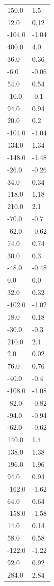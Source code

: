 \begin{longtable}{ll}
150.0 & 1.5 \\
12.0 & 0.12 \\
-104.0 & -1.04 \\
400.0 & 4.0 \\
36.0 & 0.36 \\
-6.0 & -0.06 \\
54.0 & 0.54 \\
-10.0 & -0.1 \\
94.0 & 0.94 \\
20.0 & 0.2 \\
-104.0 & -1.04 \\
134.0 & 1.34 \\
-148.0 & -1.48 \\
-26.0 & -0.26 \\
34.0 & 0.34 \\
118.0 & 1.18 \\
210.0 & 2.1 \\
-70.0 & -0.7 \\
-62.0 & -0.62 \\
74.0 & 0.74 \\
30.0 & 0.3 \\
-48.0 & -0.48 \\
0.0 & 0.0 \\
32.0 & 0.32 \\
-102.0 & -1.02 \\
18.0 & 0.18 \\
-30.0 & -0.3 \\
210.0 & 2.1 \\
2.0 & 0.02 \\
76.0 & 0.76 \\
-40.0 & -0.4 \\
-108.0 & -1.08 \\
-82.0 & -0.82 \\
-94.0 & -0.94 \\
-62.0 & -0.62 \\
140.0 & 1.4 \\
138.0 & 1.38 \\
196.0 & 1.96 \\
94.0 & 0.94 \\
-162.0 & -1.62 \\
64.0 & 0.64 \\
-158.0 & -1.58 \\
14.0 & 0.14 \\
58.0 & 0.58 \\
-122.0 & -1.22 \\
92.0 & 0.92 \\
284.0 & 2.84 \\

\end{longtable}
